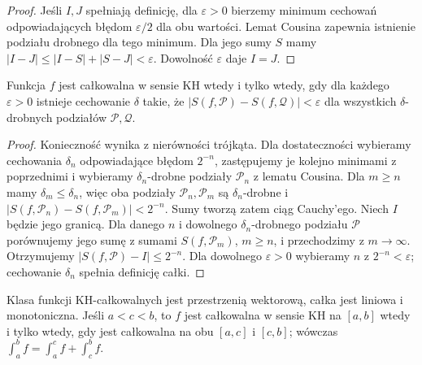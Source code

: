 \begin{proof}
Jeśli $I,J$ spełniają definicję, dla $\varepsilon>0$ bierzemy minimum cechowań odpowiadających błędom $\varepsilon/2$ dla obu wartości. Lemat Cousina zapewnia istnienie podziału drobnego dla tego minimum. Dla jego sumy $S$ mamy $|I-J|\le |I-S|+|S-J|<\varepsilon$. Dowolność $\varepsilon$ daje $I=J$.
\end{proof}
\begin{twierdzenie}\label{ma1:kh:thm:kh-cauchy}\label{it:thm:kh-cauchy}
Funkcja $f$ jest całkowalna w sensie KH wtedy i tylko wtedy, gdy dla każdego $\varepsilon>0$ istnieje cechowanie $\delta$ takie, że $|S(f,\mathcal P)-S(f,\mathcal Q)|<\varepsilon$ dla wszystkich $\delta$-drobnych podziałów $\mathcal P,\mathcal Q$.
\end{twierdzenie}
\begin{proof}
Konieczność wynika z nierówności trójkąta. Dla dostateczności wybieramy cechowania $\delta_n$ odpowiadające błędom $2^{-n}$, zastępujemy je kolejno minimami z poprzednimi i wybieramy $\delta_n$-drobne podziały $\mathcal P_n$ z lematu Cousina. Dla $m\ge n$ mamy $\delta_m\le\delta_n$, więc oba podziały $\mathcal P_n,\mathcal P_m$ są $\delta_n$-drobne i $|S(f,\mathcal P_n)-S(f,\mathcal P_m)|<2^{-n}$. Sumy tworzą zatem ciąg Cauchy'ego. Niech $I$ będzie jego granicą. Dla danego $n$ i dowolnego $\delta_n$-drobnego podziału $\mathcal P$ porównujemy jego sumę z sumami $S(f,\mathcal P_m)$, $m\ge n$, i przechodzimy z $m\to\infty$. Otrzymujemy $|S(f,\mathcal P)-I|\le2^{-n}$. Dla dowolnego $\varepsilon>0$ wybieramy $n$ z $2^{-n}<\varepsilon$; cechowanie $\delta_n$ spełnia definicję całki.
\end{proof}
\begin{twierdzenie}\label{ma1:kh:thm:kh-locality}\label{it:thm:kh-locality}
Klasa funkcji KH-całkowalnych jest przestrzenią wektorową, całka jest liniowa i monotoniczna. Jeśli $a<c<b$, to $f$ jest całkowalna w sensie KH na $[a,b]$ wtedy i tylko wtedy, gdy jest całkowalna na obu $[a,c]$ i $[c,b]$; wówczas $\int_a^b f=\int_a^c f+\int_c^b f$.
\end{twierdzenie}
